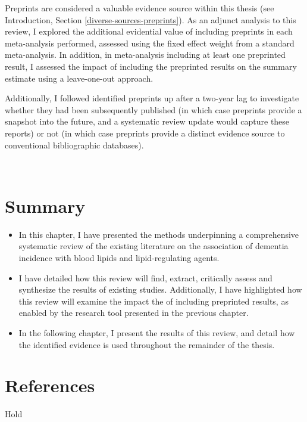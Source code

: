 \documentclass[a4paper, twoside]{templates/ociamthesis}
\begin{document}
Preprints are considered a valuable evidence source within this thesis (see Introduction, Section \ref{diverse-sources-preprints}). As an adjunct analysis to this review, I explored the additional evidential value of including preprints in each meta-analysis performed, assessed using the fixed effect weight from a standard meta-analysis. In addition, in meta-analysis including at least one preprinted result, I assessed the impact of including the preprinted results on the summary estimate using a leave-one-out approach.

Additionally, I followed identified preprints up after a two-year lag to investigate whether they had been subsequently published (in which case preprints provide a snapshot into the future, and a systematic review update would capture these reports) or not (in which case preprints provide a distinct evidence source to conventional bibliographic databases).

~

\hypertarget{summary-2}{%
\section{Summary}\label{summary-2}}

\begin{itemize}
\item
  In this chapter, I have presented the methods underpinning a comprehensive systematic review of the existing literature on the association of dementia incidence with blood lipids and lipid-regulating agents.
\item
  I have detailed how this review will find, extract, critically assess and synthesize the results of existing studies. Additionally, I have highlighted how this review will examine the impact the of including preprinted results, as enabled by the research tool presented in the previous chapter.
\item
  In the following chapter, I present the results of this review, and detail how the identified evidence is used throughout the remainder of the thesis.
\end{itemize}

\newpage

\hypertarget{references-1}{%
\section{References}\label{references-1}}

\begin{savequote}
Hold
\end{savequote}
\end{document}
